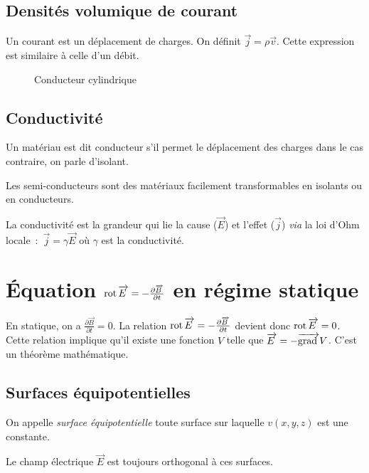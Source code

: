\subsection{Densités volumique de courant}
Un courant est un déplacement de charges. On définit $\vec{j}=\rho\vec{v}$. Cette expression est similaire à celle d'un débit. 
\begin{figure}[H]
	\centering
	\def\svgwidth{5cm}
	
	\caption{Conducteur cylindrique}
\end{figure}
\subsection{Conductivité}
Un matériau est dit conducteur s'il permet le déplacement des charges dans le cas contraire, on parle d'isolant.

Les semi-conducteurs sont des matériaux facilement transformables en isolants ou en conducteurs.

La conductivité est la grandeur qui lie la cause ($\vec{E}$) et l'effet ($\vec{j}$) \textit{via} la loi d'Ohm locale~:~$\vec{j}=\gamma\vec{E}$ où $\gamma$ est la conductivité.

\section{Équation $\operatorname{rot}\overrightarrow{E\:} = - \frac{\partial \overrightarrow{B\:}}{\partial t}$ en régime statique}
En statique, on a $ \frac{\partial \vec{B}}{\partial t} = 0$. La relation $\operatorname{rot}\overrightarrow{E\:} = - \frac{\partial \overrightarrow{B\:}}{\partial t}$ devient donc $\operatorname{rot}\overrightarrow{E\:}=0$. Cette relation implique qu'il existe une fonction $V$ telle que $\overrightarrow{E\:} = -\overrightarrow{\text{grad}\:} V$. C'est un théorème mathématique.

\subsection{Surfaces équipotentielles}
\begin{defi}
	On appelle \emph{surface équipotentielle} toute surface sur laquelle $v(x,y,z)$ est une constante.
\end{defi}
Le champ électrique $\vec{E}$ est toujours orthogonal à ces surfaces.

